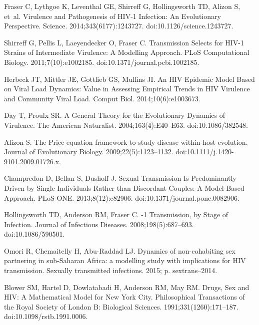 \documentclass[10pt,letterpaper]{article}
\begin{document}
\begin{thebibliography}{10}
Fraser C, Lythgoe K, Leventhal GE, Shirreff G, Hollingsworth TD, Alizon S,
  et~al.
\newblock Virulence and Pathogenesis of {HIV}-1 Infection: An Evolutionary
  Perspective.
\newblock Science. 2014;343(6177):1243727.
\newblock doi:{10.1126/science.1243727}.

Shirreff G, Pellis L, Laeyendecker O, Fraser C.
\newblock Transmission Selects for {HIV-1} Strains of Intermediate Virulence: A
  Modelling Approach.
\newblock PLoS Computational Biology. 2011;7(10):e1002185.
\newblock doi:{10.1371/journal.pcbi.1002185}.

Herbeck JT, Mittler JE, Gottlieb GS, Mullins JI.
\newblock An {HIV} Epidemic Model Based on Viral Load Dynamics: Value in
  Assessing Empirical Trends in {HIV} Virulence and Community Viral Load.
 Comput Biol. 2014;10(6):e1003673.

Day T, Proulx SR.
\newblock A General Theory for the Evolutionary Dynamics of Virulence.
\newblock The American Naturalist. 2004;163(4):E40--E63.
\newblock doi:{10.1086/382548}.

Alizon S.
\newblock The {Price} equation framework to study disease within-host
  evolution.
\newblock Journal of Evolutionary Biology. 2009;22(5):1123--1132.
\newblock doi:{10.1111/j.1420-9101.2009.01726.x}.

Champredon D, Bellan S, Dushoff J.
 Sexual Transmission Is Predominantly Driven by Single
  Individuals Rather than Discordant Couples: A Model-Based Approach.
\newblock PLoS ONE. 2013;8(12):e82906.
\newblock doi:{10.1371/journal.pone.0082906}.

Hollingsworth TD, Anderson RM, Fraser C.
-1 Transmission, by Stage of Infection.
\newblock Journal of Infectious Diseases. 2008;198(5):687--693.
\newblock doi:{10.1086/590501}.

Omori R, Chemaitelly H, Abu-Raddad LJ.
\newblock Dynamics of non-cohabiting sex partnering in sub-Saharan Africa: a
  modelling study with implications for HIV transmission.
\newblock Sexually transmitted infections. 2015; p. sextrans--2014.

Blower SM, Hartel D, Dowlatabadi H, Anderson RM, May RM.
\newblock Drugs, Sex and {HIV}: A Mathematical Model for {New York City}.
\newblock Philosophical Transactions of the Royal Society of London B:
  Biological Sciences. 1991;331(1260):171--187.
\newblock doi:{10.1098/rstb.1991.0006}.


\end{thebibliography}
\end{document}
